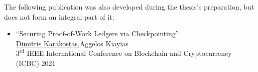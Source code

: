
The following publication was also developed during the thesis's preparation,
but does not form an integral part of it:
\begin{itemize}
    \item
        ``Securing Proof-of-Work Ledgers via Checkpointing''~\cite{checkpointsSCN}\\
        \underline{Dimitris Karakostas},\footnotemark[1] Aggelos Kiayias\\
        $3^\text{rd}$ IEEE International Conference on Blockchain and Cryptocurrency (ICBC) 2021
\end{itemize}


